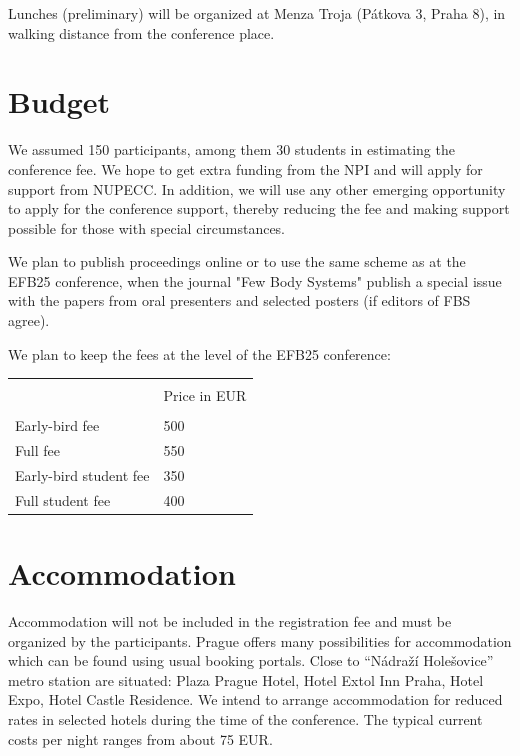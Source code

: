 \documentclass[12pt]{extarticle}
\begin{document}
Lunches (preliminary) will be organized at Menza Troja (Pátkova 3, Praha 8), in walking distance from
the conference place.



\section*{Budget}
\noindent
We assumed 150 participants, among them 30 students in estimating the conference fee.
We hope to get extra funding from the NPI and will apply for support from NUPECC.
In addition, we will use any other emerging opportunity to apply for the conference
support, thereby reducing the fee and making support possible for those with special circumstances.

We plan to publish proceedings online or to use the same scheme as at the EFB25 conference, when
the journal "Few Body Systems" publish a special issue with the papers from oral presenters and
selected posters (if editors of FBS agree).

%
We plan to keep the fees at the level of the EFB25 conference:
\begin{table}[h]
\centering
\begin{tabular}{ll}
\hline \\[-1mm]
 &   Price in EUR  \\[1mm]
\hline \\[-1mm]
 Early-bird fee & 500  \\[1mm]
 Full fee &  550 \\[1mm]
 Early-bird student fee & 350  \\[1mm]
 Full student fee &  400 \\[1mm]
\hline
\end{tabular}
\end{table}

\section*{Accommodation}
\noindent
Accommodation will not be included in the registration fee and must be organized by the participants.
Prague offers many possibilities for accommodation which can be found using usual booking portals. Close
to “Nádraží Holešovice” metro station are situated: Plaza Prague Hotel, Hotel Extol Inn Praha, Hotel Expo, Hotel
Castle Residence. We intend to arrange accommodation for reduced rates in selected hotels during the time of
the conference. The typical current costs per night ranges from about 75 EUR.
\end{document}

